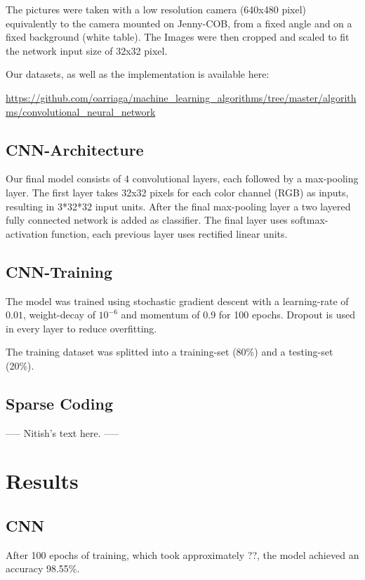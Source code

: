 \documentclass[	DIV=calc,%
				paper=a4,%
				fontsize=11pt,%
				twocolumn]{scrartcl}	 %
\begin{document}
The pictures were taken with a low resolution camera (640x480 pixel) equivalently to the camera mounted on Jenny-COB, from a fixed angle and on a fixed background (white table).
The Images were then cropped and scaled to fit the network input size of 32x32 pixel.

Our datasets, as well as the implementation is available here: \begin{tiny}\url{https://github.com/oarriaga/machine_learning_algorithms/tree/master/algorithms/convolutional_neural_network}\end{tiny}

\subsection*{CNN-Architecture}
Our final model consists of 4 convolutional layers, each followed by a max-pooling layer. The first layer takes 32x32 pixels for each color channel (RGB) as inputs, resulting in 3*32*32 input units.
After the final max-pooling layer a two layered fully connected network is added as classifier. The final layer uses softmax-activation function, each previous layer uses rectified linear units.

\subsection{CNN-Training}
The model was trained using stochastic gradient descent with a learning-rate of $0.01$, weight-decay of $10^{-6}$ and momentum of 0.9 for 100 epochs.
Dropout is used in every layer to reduce overfitting.

The training dataset was splitted into a training-set (80\%) and a testing-set (20\%).

\subsection*{Sparse Coding}
----- Nitish's text here. -----

\section{Results}

\subsection*{CNN}
After 100 epochs of training, which took approximately ??, the model achieved an accuracy 98.55\%.
\end{document}
